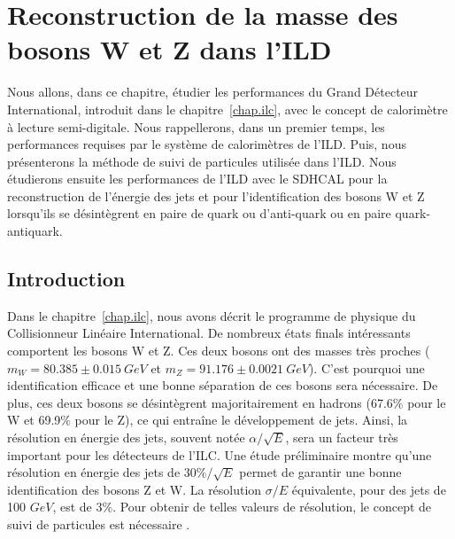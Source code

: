 \chapter{Reconstruction de la masse des bosons W et Z dans l'ILD}
\label{chap.ild}
Nous allons, dans ce chapitre, étudier les performances du Grand Détecteur International, introduit dans le chapitre~\ref{chap.ilc}, avec le concept de calorimètre à lecture semi-digitale. Nous rappellerons, dans un premier temps, les performances requises par le système de calorimètres de l'ILD. Puis, nous présenterons la méthode de suivi de particules utilisée dans l'ILD. Nous étudierons ensuite les performances de l'ILD avec le SDHCAL pour la reconstruction de l'énergie des jets et pour l'identification des bosons W et Z lorsqu'ils se désintègrent en paire de quark ou d'anti-quark ou en paire quark-antiquark. 
\minitoc
\newpage


\section{Introduction}
\label{sec.jetintro}
Dans le chapitre~\ref{chap.ilc}, nous avons décrit le programme de physique du Collisionneur Linéaire International. De nombreux états finals intéressants comportent les bosons W et Z. Ces deux bosons ont des masses très proches ($m_W=80.385\pm0.015~GeV$ et $m_Z=91.176\pm0.0021~GeV$). C'est pourquoi une identification efficace et une bonne séparation de ces bosons sera nécessaire. De plus, ces deux bosons se désintègrent majoritairement en hadrons (67.6$\%$ pour le W et 69.9$\%$ pour le Z), ce qui entraîne le développement de jets. Ainsi, la résolution en énergie des jets, souvent notée $\alpha/\sqrt{E}$, sera un facteur très important pour les détecteurs de l'ILC. Une étude préliminaire \cite{brient} montre qu'une résolution en énergie des jets de $30\%/\sqrt{E}$ permet de garantir une bonne identification des bosons Z et W. La résolution $\sigma/E$ équivalente, pour des jets de 100 $GeV$, est de 3$\%$. Pour obtenir de telles valeurs de résolution, le concept de suivi de particules est nécessaire \cite{pfaPandora}.

